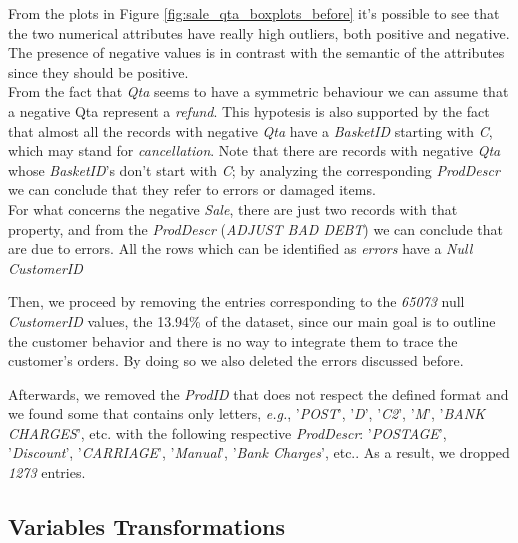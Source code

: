 From the plots in Figure \ref{fig:sale_qta_boxplots_before} it's possible to see that the two numerical attributes have really high outliers, both positive and negative. The presence of negative values is in contrast with the semantic of the attributes since they should be positive.\\
From the fact that \emph{Qta} seems to have a symmetric behaviour we can assume that a negative Qta represent a \emph{refund}. This hypotesis is also supported by the fact that almost all the records with negative \emph{Qta} have a \emph{BasketID} starting with \emph{C}, which may stand for \emph{cancellation}. Note that there are records with negative \emph{Qta} whose \emph{BasketID}'s don't start with \emph{C}; by analyzing the corresponding \emph{ProdDescr} we can conclude that they refer to errors or damaged items.\\
For what concerns the negative \emph{Sale}, there are just two records with that property, and from the \emph{ProdDescr} (\emph{ADJUST BAD DEBT}) we can conclude that are due to errors. All the rows which can be identified as \emph{errors} have a \emph{Null} \emph{CustomerID}

Then, we proceed by removing the entries corresponding to the \emph{65073} null \emph{CustomerID} values, the 13.94\% of the dataset, since our main goal is to outline the customer behavior and there is no way to integrate them to trace the customer's orders. By doing so we also deleted the errors discussed before.

Afterwards, we removed the \emph{ProdID} that does not respect the defined format and we found some that contains only letters, \emph{e.g.}, '\emph{POST}', '\emph{D}', '\emph{C2}', '\emph{M}', '\emph{BANK CHARGES}', etc. with the following respective \emph{ProdDescr}: '\emph{POSTAGE}', '\emph{Discount}', '\emph{CARRIAGE}', '\emph{Manual}', '\emph{Bank Charges}', etc.. As a result, we dropped \emph{1273} entries.

\pagebreak
\subsection{Variables Transformations}

